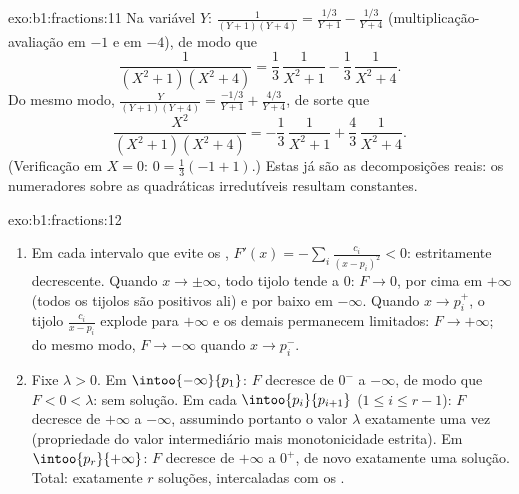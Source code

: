 \begin{solution}{exo:b1:fractions:11}
Na variável $Y$: $\frac1{(Y+1)(Y+4)} = \frac{1/3}{Y+1} -
\frac{1/3}{Y+4}$ (multiplicação-avaliação em $-1$ e em $-4$), de modo que
\[
\frac{1}{(X^2+1)(X^2+4)}
= \frac13\,\frac1{X^2+1} - \frac13\,\frac1{X^2+4} .
\]
Do mesmo modo, $\frac{Y}{(Y+1)(Y+4)} = \frac{-1/3}{Y+1} +
\frac{4/3}{Y+4}$, de sorte que
\[
\frac{X^2}{(X^2+1)(X^2+4)}
= -\frac13\,\frac1{X^2+1} + \frac43\,\frac1{X^2+4} .
\]
(Verificação em $X = 0$: $0 = \frac13(-1 + 1)$.) Estas já são as
decomposições reais: os numeradores sobre as quadráticas irredutíveis
resultam constantes.
\end{solution}

\begin{solution}{exo:b1:fractions:12}
\begin{enumerate}
  \item Em cada intervalo que evite os , $F'(x) = -\sum_i
        \frac{c_i}{(x - p_i)^2} < 0$: estritamente decrescente. Quando $x
        \to \pm\infty$, todo tijolo tende a $0$: $F \to 0$, por
        cima em $+\infty$ (todos os tijolos são positivos ali) e por
        baixo em $-\infty$. Quando $x \to p_i^+$, o tijolo
        $\frac{c_i}{x - p_i}$ explode para $+\infty$ e os demais
        permanecem limitados: $F \to +\infty$; do mesmo modo, $F \to -\infty$ quando $x \to p_i^-$.
  \item Fixe $\lambda > 0$. Em $\intoo{-\infty}{p_1}$: $F$
        decresce de $0^-$ a $-\infty$, de modo que $F < 0 < \lambda$:
        sem solução. Em cada $\intoo{p_i}{p_{i+1}}$ ($1 \leq i
        \leq r-1$): $F$ decresce de $+\infty$ a $-\infty$,
        assumindo portanto o valor $\lambda$ exatamente uma vez
        (propriedade do valor intermediário mais monotonicidade
        estrita). Em $\intoo{p_r}{+\infty}$: $F$ decresce de $+\infty$ a
        $0^+$, de novo exatamente uma solução. Total: exatamente $r$
        soluções, intercaladas com os .
\end{enumerate}
\end{solution}

